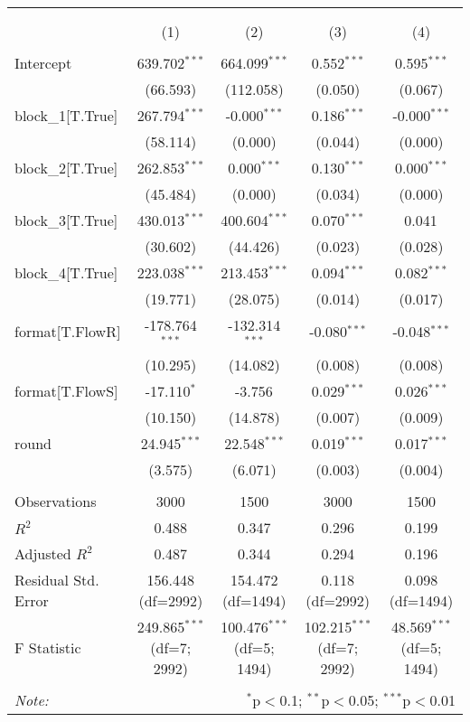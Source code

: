 \begin{table}[!htbp] \centering
\begin{tabular}{@{\extracolsep{5pt}}lcccc}
\\[-1.8ex]\hline
\hline \\[-1.8ex]
\\[-1.8ex] & (1) & (2) & (3) & (4) \\
\hline \\[-1.8ex]
 Intercept & 639.702$^{***}$ & 664.099$^{***}$ & 0.552$^{***}$ & 0.595$^{***}$ \\
& (66.593) & (112.058) & (0.050) & (0.067) \\
 block_1[T.True] & 267.794$^{***}$ & -0.000$^{***}$ & 0.186$^{***}$ & -0.000$^{***}$ \\
& (58.114) & (0.000) & (0.044) & (0.000) \\
 block_2[T.True] & 262.853$^{***}$ & 0.000$^{***}$ & 0.130$^{***}$ & 0.000$^{***}$ \\
& (45.484) & (0.000) & (0.034) & (0.000) \\
 block_3[T.True] & 430.013$^{***}$ & 400.604$^{***}$ & 0.070$^{***}$ & 0.041$^{}$ \\
& (30.602) & (44.426) & (0.023) & (0.028) \\
 block_4[T.True] & 223.038$^{***}$ & 213.453$^{***}$ & 0.094$^{***}$ & 0.082$^{***}$ \\
& (19.771) & (28.075) & (0.014) & (0.017) \\
 format[T.FlowR] & -178.764$^{***}$ & -132.314$^{***}$ & -0.080$^{***}$ & -0.048$^{***}$ \\
& (10.295) & (14.082) & (0.008) & (0.008) \\
 format[T.FlowS] & -17.110$^{*}$ & -3.756$^{}$ & 0.029$^{***}$ & 0.026$^{***}$ \\
& (10.150) & (14.878) & (0.007) & (0.009) \\
 round & 24.945$^{***}$ & 22.548$^{***}$ & 0.019$^{***}$ & 0.017$^{***}$ \\
& (3.575) & (6.071) & (0.003) & (0.004) \\
\hline \\[-1.8ex]
 Observations & 3000 & 1500 & 3000 & 1500 \\
 $R^2$ & 0.488 & 0.347 & 0.296 & 0.199 \\
 Adjusted $R^2$ & 0.487 & 0.344 & 0.294 & 0.196 \\
 Residual Std. Error & 156.448 (df=2992) & 154.472 (df=1494) & 0.118 (df=2992) & 0.098 (df=1494) \\
 F Statistic & 249.865$^{***}$ (df=7; 2992) & 100.476$^{***}$ (df=5; 1494) & 102.215$^{***}$ (df=7; 2992) & 48.569$^{***}$ (df=5; 1494) \\
\hline
\hline \\[-1.8ex]
\textit{Note:} & \multicolumn{4}{r}{$^{*}$p$<$0.1; $^{**}$p$<$0.05; $^{***}$p$<$0.01} \\
\end{tabular}
\end{table}
